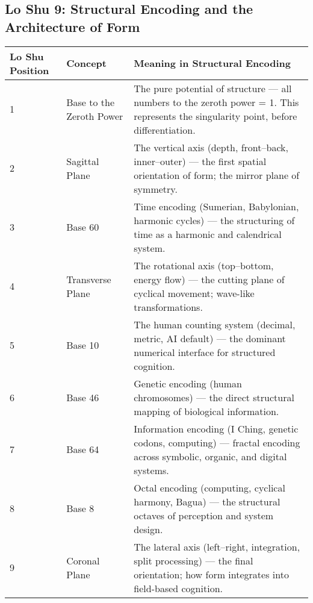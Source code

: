 \documentclass{article}
\begin{document}
\begin{landscape}

\section*{Lo Shu 9: Structural Encoding and the Architecture of Form}

\renewcommand{\arraystretch}{1.4}

\begin{tabular}{|p{1.8cm}|p{3.8cm}|p{10.2cm}|}
\hline
\textbf{Lo Shu Position} & 
\textbf{Concept} & 
\textbf{Meaning in Structural Encoding} \\
\hline

1 & 
Base to the Zeroth Power & 
The pure potential of structure — all numbers to the zeroth power = 1. This represents the singularity point, before differentiation. \\
\hline

2 & 
Sagittal Plane & 
The vertical axis (depth, front–back, inner–outer) — the first spatial orientation of form; the mirror plane of symmetry. \\
\hline

3 & 
Base 60 & 
Time encoding (Sumerian, Babylonian, harmonic cycles) — the structuring of time as a harmonic and calendrical system. \\
\hline

4 & 
Transverse Plane & 
The rotational axis (top–bottom, energy flow) — the cutting plane of cyclical movement; wave-like transformations. \\
\hline

5 & 
Base 10 & 
The human counting system (decimal, metric, AI default) — the dominant numerical interface for structured cognition. \\
\hline

6 & 
Base 46 & 
Genetic encoding (human chromosomes) — the direct structural mapping of biological information. \\
\hline

7 & 
Base 64 & 
Information encoding (I Ching, genetic codons, computing) — fractal encoding across symbolic, organic, and digital systems. \\
\hline

8 & 
Base 8 & 
Octal encoding (computing, cyclical harmony, Bagua) — the structural octaves of perception and system design. \\
\hline

9 & 
Coronal Plane & 
The lateral axis (left–right, integration, split processing) — the final orientation; how form integrates into field-based cognition. \\
\hline

\end{tabular}

\end{landscape}
\end{document}
